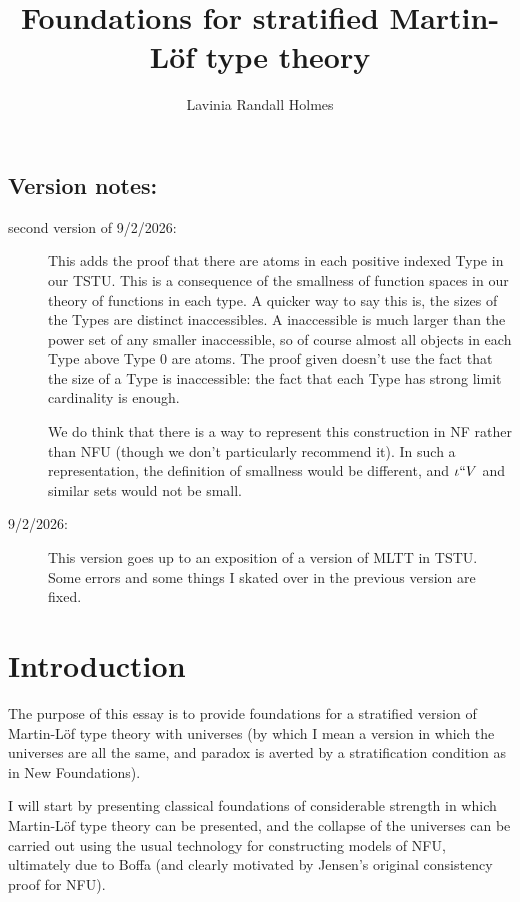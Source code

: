 \documentclass[12pt]{article}
\title{Foundations for stratified Martin-L\"of type theory}
\author{Lavinia Randall Holmes}
\begin{document}
\maketitle

\subsection{Version notes:}

\begin{description}

\item[second version of 9/2/2026:]  This adds the proof that there are atoms in each positive indexed Type in our TSTU.
This is a consequence of the smallness of function spaces in our theory of functions in each type.  A quicker way to say this is,
the sizes of the Types are distinct inaccessibles.   A inaccessible is much larger than the power set of any smaller inaccessible, so of course almost all objects in each Type above Type 0 are atoms.  The proof given doesn't use the fact that the size of a Type is inaccessible:  the fact that each Type has strong limit cardinality is enough.

We do think that there is a way to represent this construction in NF rather than NFU (though we don't particularly recommend it).
In such a representation, the definition of smallness would be different, and $\iota``V$ and similar sets would not be small.

\item[9/2/2026:]  This version goes up to an exposition of a version of MLTT in TSTU.  Some errors and some things I skated over in the previous version are fixed.

\end{description}

\section{Introduction}

The purpose of this essay is to provide foundations for a stratified version of Martin-L\"of type theory with universes (by which I mean a version in which the universes are all the same, and paradox is averted by a stratification condition as in New Foundations).

I will start by presenting classical foundations of considerable strength in which Martin-L\"of type theory can be presented, and the collapse of the universes can be carried out using the usual technology for constructing models of
NFU, ultimately due to Boffa (and clearly motivated by Jensen's original consistency proof for NFU).  
\end{document}
